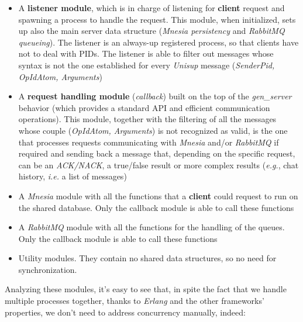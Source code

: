 \begin{itemize}
	\item A \textbf{listener module}, which is in charge of listening for \textbf{client} request and spawning a process to handle the request. This module, when initialized, sets up also the main server data structure (\textit{Mnesia persistency} and \textit{RabbitMQ queueing}). The listener is an always-up registered process, so that clients have not to deal with PIDs. The listener is able to filter out messages whose syntax is not the one established for every \textit{Unisup} message (\textit{SenderPid, OpIdAtom, Arguments})
	\item A \textbf{request handling module} (\textit{callback}) built on the top of the \textit{gen\_server} behavior (which provides a standard API and efficient communication operations). This module, together with the filtering of all the messages whose couple (\textit{OpIdAtom, Arguments}) is not recognized as valid, is the one that processes requests communicating with \textit{Mnesia} and/or \textit{RabbitMQ} if required and sending back a message that, depending on the specific request, can be an \textit{ACK/NACK}, a true/false result or more complex results (\textit{e.g.}, chat history, \textit{i.e.} a list of messages)
	\item A \textit{Mnesia} module with all the functions that a \textbf{client}  could request to run on the shared database. Only the callback module is able to call these functions
	\item A \textit{RabbitMQ} module with all the functions for the handling of the queues. Only the callback module is able to call these functions
	\item Utility modules. They contain no shared data structures, so no need for synchronization.
\end{itemize}

Analyzing these modules, it’s easy to see that, in spite the fact that we handle multiple processes together, thanks to \textit{Erlang} and the other frameworks’ properties, we don’t need to address concurrency manually, indeed:

